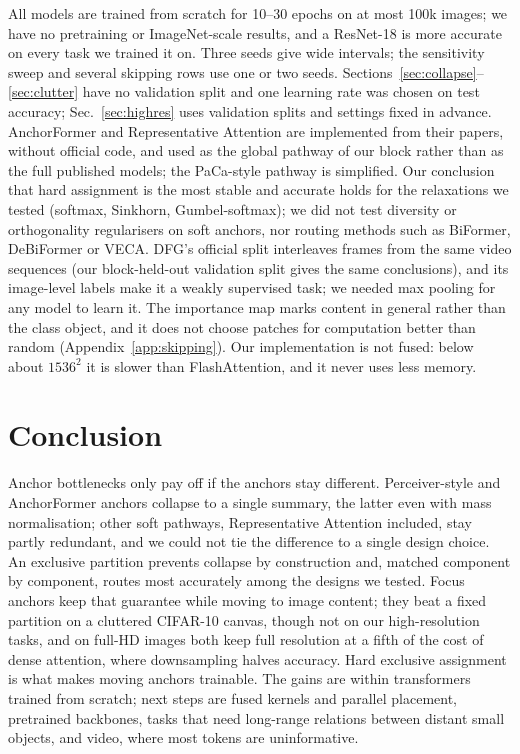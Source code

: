 \documentclass[10pt]{article}
\begin{document}
All models are trained from scratch for 10--30 epochs on at most 100k images; we have no
pretraining or ImageNet-scale results, and a ResNet-18 is more accurate on every task we trained
it on. Three seeds
give wide intervals; the sensitivity sweep and several skipping rows use one or two seeds.
Sections~\ref{sec:collapse}--\ref{sec:clutter} have no validation split and one learning rate
was chosen on test accuracy; Sec.~\ref{sec:highres} uses validation splits and settings fixed in
advance. AnchorFormer and Representative Attention are implemented from their papers, without
official code, and used as the global pathway of our block rather than as the full published
models; the PaCa-style pathway is simplified. Our conclusion that hard assignment is the most
stable and accurate holds for the relaxations we tested (softmax, Sinkhorn, Gumbel-softmax); we
did not test diversity or orthogonality regularisers on soft anchors, nor routing methods such
as BiFormer, DeBiFormer or VECA. DFG's official split interleaves frames from the
same video sequences (our block-held-out validation split gives the same conclusions), and its
image-level labels make it a weakly supervised task; we needed max
pooling for any model to learn it. The importance map marks content in general rather than the
class object, and it does not choose patches for computation better than random
(Appendix~\ref{app:skipping}). Our implementation is not fused: below about $1536^2$ it is slower
than FlashAttention, and it never uses less memory.

\section{Conclusion}

Anchor bottlenecks only pay off if the anchors stay different. Perceiver-style and AnchorFormer
anchors collapse to a single summary, the latter even with mass normalisation; other soft
pathways, Representative Attention included, stay partly redundant, and we could not tie the
difference to a single design choice. An exclusive partition prevents collapse by construction and, matched
component by component, routes most accurately among the designs we tested. Focus anchors keep
that guarantee while moving to image content; they beat a fixed partition on a cluttered CIFAR-10
canvas, though not on our high-resolution tasks, and on full-HD images both keep full resolution
at a fifth of the cost of dense attention, where downsampling halves accuracy. Hard exclusive assignment is what makes moving
anchors trainable. The gains are within transformers trained from scratch; next steps are fused
kernels and parallel placement, pretrained backbones, tasks that need long-range relations
between distant small objects, and video, where most tokens are uninformative.
\end{document}
